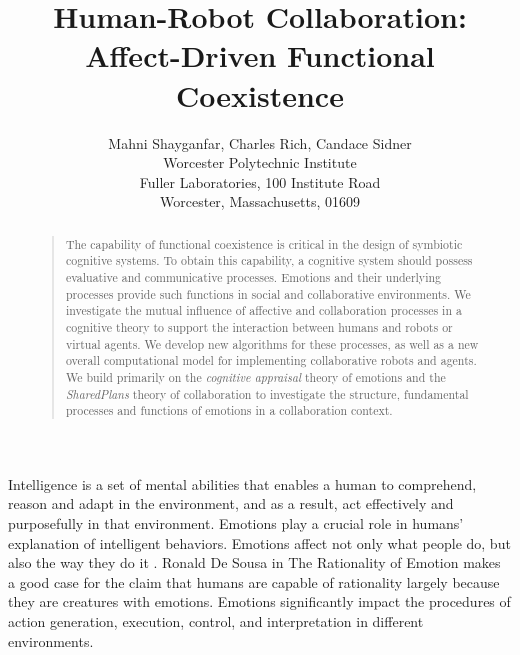 \documentclass[letterpaper]{article}
\begin{document}
%
\title{Human-Robot Collaboration: Affect-Driven Functional Coexistence}
\author{Mahni Shayganfar, Charles Rich, Candace Sidner\\
Worcester Polytechnic Institute\\
Fuller Laboratories, 100 Institute Road\\
Worcester, Massachusetts, 01609\\
}
\maketitle
\begin{abstract}
\begin{quote}
The capability of functional coexistence is critical in the design of symbiotic
cognitive systems. To obtain this capability, a cognitive system should possess
evaluative and communicative processes. Emotions and their underlying processes
provide such functions in social and collaborative environments. We investigate
the mutual influence of affective and collaboration processes in a cognitive
theory to support the interaction between humans and robots or virtual agents.
We develop new algorithms for these processes, as well as a new overall
computational model for implementing collaborative robots and agents. We build
primarily on the \textit{cognitive appraisal} theory of emotions and the
\textit{SharedPlans} theory of collaboration to investigate the structure,
fundamental processes and functions of emotions in a collaboration context.
\end{quote}
\end{abstract}

Intelligence is a set of mental abilities that enables a human to comprehend,
reason and adapt in the environment, and as a result, act effectively and
purposefully in that environment. Emotions play a crucial role in humans'
explanation of intelligent behaviors. Emotions affect not only what people do,
but also the way they do it \cite{cowie:concepts-definitions}. Ronald De Sousa
in The Rationality of Emotion \cite{sousa:rationality-emotion} makes a good case
for the claim that humans are capable of rationality largely because they are
creatures with emotions. Emotions significantly impact the procedures of action
generation, execution, control, and interpretation \cite{zhu:emotion-action} in
different environments. 
\end{document}
